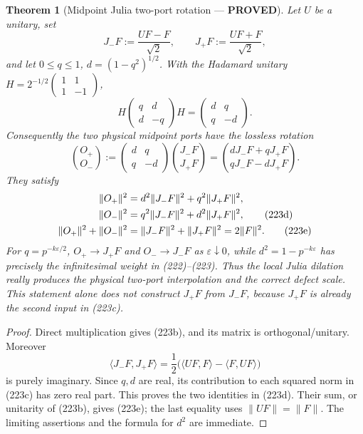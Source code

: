 \documentclass[11pt]{article}
\newtheorem{theorem}{Theorem}
\newcommand{\PROVED}{\textcolor{green!45!black}{\textbf{PROVED}}}
\begin{document}
\begin{theorem}[Midpoint Julia two-port rotation --- \PROVED]
Let $U$ be a unitary, set
\begin{equation}
 J_-F:=\frac{UF-F}{\sqrt2},\qquad
 J_+F:=\frac{UF+F}{\sqrt2},                          \tag{223a}
\end{equation}
and let $0\le q\le1$, $d=(1-q^2)^{1/2}$.  With the Hadamard unitary
$H=2^{-1/2}\left(\begin{smallmatrix}1&1\\1&-1\end{smallmatrix}\right)$,
\begin{equation}
 H\begin{pmatrix}q&d\\d&-q\end{pmatrix}H
 =\begin{pmatrix}d&q\\q&-d\end{pmatrix}.           \tag{223b}
\end{equation}
Consequently the two physical midpoint ports have the lossless rotation
\begin{equation}
 \binom{O_+}{O_-}
 :=\begin{pmatrix}d&q\\q&-d\end{pmatrix}
       \binom{J_-F}{J_+F}
 =\binom{dJ_-F+qJ_+F}{qJ_-F-dJ_+F}.                 \tag{223c}
\end{equation}
They satisfy
\begin{align}
 \|O_+\|^2&=d^2\|J_-F\|^2+q^2\|J_+F\|^2,\notag\\
 \|O_-\|^2&=q^2\|J_-F\|^2+d^2\|J_+F\|^2,          \tag{223d}\\
 \|O_+\|^2+\|O_-\|^2
 &=\|J_-F\|^2+\|J_+F\|^2=2\|F\|^2.                \tag{223e}
\end{align}
For $q=p^{-k\varepsilon/2}$, $O_+\to J_+F$ and
$O_-\to J_-F$ as $\varepsilon\downarrow0$, while
$d^2=1-p^{-k\varepsilon}$ has precisely the infinitesimal weight in
(222)--(223).  Thus the local Julia dilation really produces the physical
two-port interpolation and the correct defect scale.  This statement alone
does not construct $J_+F$ from $J_-F$, because $J_+F$ is already the second
input in (223c).
\end{theorem}

\begin{proof}
Direct multiplication gives (223b), and its matrix is orthogonal/unitary.
Moreover
\[
 \langle J_-F,J_+F\rangle
 =\frac12\bigl(\langle UF,F\rangle
                -\langle F,UF\rangle\bigr)
\]
is purely imaginary.  Since $q,d$ are real, its contribution to each squared
norm in (223c) has zero real part.  This proves the two identities in (223d).
Their sum, or unitarity of (223b), gives (223e); the last equality uses
$\|UF\|=\|F\|$.  The limiting assertions and the formula for $d^2$ are
immediate.
\end{proof}
\end{document}
